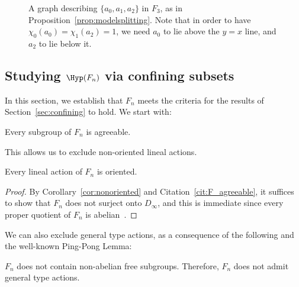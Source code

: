 \begin{figure}[htb]
\centering
{}
\caption{A graph describing $\{ a_0, a_1, a_2 \}$ in $F_3$, as in Proposition~\ref{prop:modelsplitting}. Note that in order to have $\chi_0(a_0)=\chi_1(a_2)=1$, we need $a_0$ to lie above the $y=x$ line, and $a_2$ to lie below it.}
\label{fig:bumps}
\end{figure}


\subsection{Studying \texorpdfstring{$\Hyp(F_n)$}{Hyp(Fn)} via confining subsets}

In this section, we establish that $F_n$ meets the criteria for the results of Section~\ref{sec:confining} to hold. We start with:

\begin{cit}
\label{cit:F_agreeable}
Every subgroup of $F_n$ is agreeable.
\end{cit}

This allows us to exclude non-oriented lineal actions.

\begin{coro}\label{cor:nonoriented:f}
Every lineal action of $F_n$ is oriented.
\end{coro}

\begin{proof}
By Corollary~\ref{cor:nonoriented} and Citation~\ref{cit:F_agreeable}, it suffices to show that $F_n$ does not surject onto $D_\infty$, and this is immediate since every proper quotient of $F_n$ is abelian~\cite[Theorem~4.13]{brown87}.
\end{proof}

We can also exclude general type actions, as a consequence of the following and the well-known Ping-Pong Lemma:

\begin{cit}
\label{cit:nofree}
    $F_n$ does not contain non-abelian free subgroups. Therefore, $F_n$ does not admit general type actions.
\end{cit}

